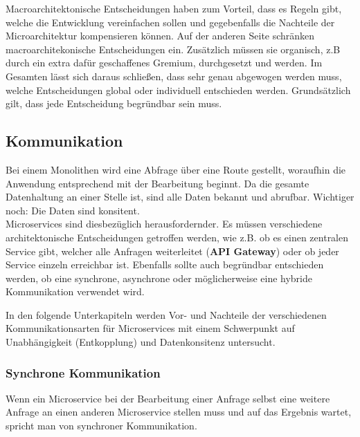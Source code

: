 Macroarchitektonische Entscheidungen haben zum Vorteil, dass es Regeln gibt, welche die Entwicklung vereinfachen sollen und gegebenfalls die Nachteile der Microarchitektur kompensieren können. Auf der anderen Seite schränken macroarchitekonische Entscheidungen ein. Zusätzlich müssen sie organisch, z.B durch ein extra dafür geschaffenes Gremium, durchgesetzt und werden.\cite{wolff2018mic_praxis} Im Gesamten lässt sich daraus schließen, dass sehr genau abgewogen werden muss, welche Entscheidungen global oder individuell entschieden werden. Grundsätzlich gilt, dass jede Entscheidung begründbar sein muss.    

\subsection{Kommunikation}

Bei einem Monolithen wird eine Abfrage über eine Route gestellt, woraufhin die Anwendung entsprechend mit der Bearbeitung beginnt. Da die gesamte Datenhaltung an einer Stelle ist, sind alle Daten bekannt und abrufbar. Wichtiger noch: Die Daten sind konsitent. \\

Microservices sind diesbezüglich herausfordernder. Es müssen verschiedene architektonische Entscheidungen getroffen werden, wie z.B. ob es einen zentralen Service gibt, welcher alle Anfragen weiterleitet (\textbf{API Gateway}) oder ob jeder Service einzeln erreichbar ist. Ebenfalls sollte auch begründbar entschieden werden, ob eine synchrone,  asynchrone oder möglicherweise eine hybride Kommunikation verwendet wird. 

In den folgende Unterkapiteln werden Vor- und Nachteile der verschiedenen Kommunikationsarten für Microservices mit einem Schwerpunkt auf Unabhängigkeit (Entkopplung) und Datenkonsitenz untersucht.


\subsubsection{Synchrone Kommunikation}\label{sec:synchrone_kommunikation}

Wenn ein Microservice bei der Bearbeitung einer Anfrage selbst eine weitere Anfrage an einen anderen Microservice stellen muss und auf das Ergebnis wartet, spricht man von synchroner Kommunikation.\cite{wolff2018mic_praxis} 

